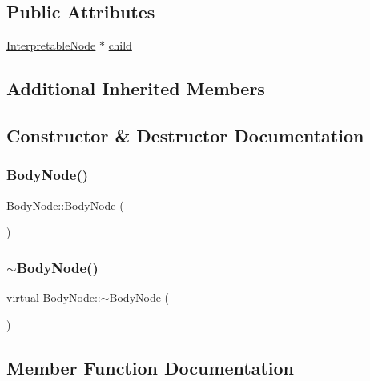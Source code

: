 \subsection*{Public Attributes}
\begin{DoxyCompactItemize}
\item 
\hyperlink{classInterpretableNode}{Interpretable\+Node} $\ast$ \hyperlink{classBodyNode_a6b18b29807903661a9f06e865331fca4}{child}
\end{DoxyCompactItemize}
\subsection*{Additional Inherited Members}


\subsection{Constructor \& Destructor Documentation}
\mbox{\label{classBodyNode_ac431b406e16e66745f5413eb868f23b8}} 
\subsubsection{\texorpdfstring{Body\+Node()}{BodyNode()}}
{\footnotesize\ttfamily Body\+Node\+::\+Body\+Node (\begin{DoxyParamCaption}{ }\end{DoxyParamCaption})}

\mbox{\label{classBodyNode_acf86c2f7982224510b39a5f35de0bbde}} 
\subsubsection{\texorpdfstring{$\sim$\+Body\+Node()}{~BodyNode()}}
{\footnotesize\ttfamily virtual Body\+Node\+::$\sim$\+Body\+Node (\begin{DoxyParamCaption}{ }\end{DoxyParamCaption})\hspace{0.3cm}{\ttfamily [virtual]}}



\subsection{Member Function Documentation}
\mbox{\label{classBodyNode_ab8a99f9e2c7d33f7cf4cbb07a61bec0f}} 
